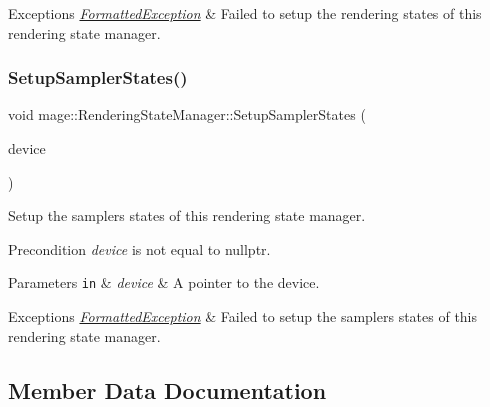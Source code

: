 \begin{DoxyExceptions}{Exceptions}
{\em \hyperlink{structmage_1_1_formatted_exception}{Formatted\+Exception}} & Failed to setup the rendering states of this rendering state manager. \\
\hline
\end{DoxyExceptions}
\hypertarget{classmage_1_1_rendering_state_manager_a24bbe9cad45338b64979388de4247c57}{}\label{classmage_1_1_rendering_state_manager_a24bbe9cad45338b64979388de4247c57} 
\subsubsection{\texorpdfstring{Setup\+Sampler\+States()}{SetupSamplerStates()}}
{\footnotesize\ttfamily void mage\+::\+Rendering\+State\+Manager\+::\+Setup\+Sampler\+States (\begin{DoxyParamCaption}\item[{I\+D3\+D11\+Device2 $\ast$}]{device }\end{DoxyParamCaption})\hspace{0.3cm}{\ttfamily [private]}}

Setup the samplers states of this rendering state manager.

\begin{DoxyPrecond}{Precondition}
{\itshape device} is not equal to {\ttfamily nullptr}. 
\end{DoxyPrecond}

\begin{DoxyParams}[1]{Parameters}
\mbox{\tt in}  & {\em device} & A pointer to the device. \\
\hline
\end{DoxyParams}

\begin{DoxyExceptions}{Exceptions}
{\em \hyperlink{structmage_1_1_formatted_exception}{Formatted\+Exception}} & Failed to setup the samplers states of this rendering state manager. \\
\hline
\end{DoxyExceptions}


\subsection{Member Data Documentation}
\hypertarget{classmage_1_1_rendering_state_manager_ad50dc7c990bf42580e511c55684e6630}{}\label{classmage_1_1_rendering_state_manager_ad50dc7c990bf42580e511c55684e6630} 
